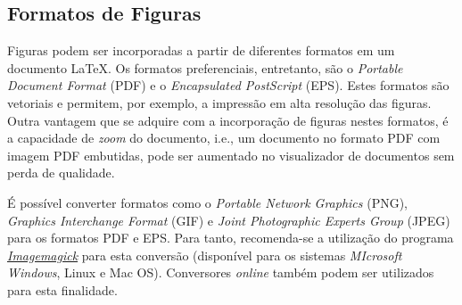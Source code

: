 %
%
%


\subsection*{Formatos de Figuras}
\label{sec:form_docs/figs}

Figuras podem ser incorporadas a partir de diferentes formatos em um documento \LaTeX{}. Os formatos preferenciais, entretanto, são o \textit{Portable Document Format} (PDF) e o \textit{Encapsulated PostScript} (EPS). Estes formatos são vetoriais e permitem, por exemplo, a impressão em alta resolução das figuras. Outra vantagem que se adquire com a incorporação de figuras nestes formatos, é a capacidade de \textit{zoom} do documento, i.e., um documento no formato PDF com imagem PDF embutidas, pode ser aumentado no visualizador de documentos sem perda de qualidade.

É possível converter formatos como o \textit{Portable Network Graphics} (PNG), \textit{Graphics Interchange Format} (GIF) e \textit{Joint Photographic Experts Group} (JPEG) para os formatos PDF e EPS. Para tanto, recomenda-se a utilização do programa \href{https://imagemagick.org/index.php}{\textit{Imagemagick}} para esta conversão (disponível para os sistemas \textit{MIcrosoft Windows}, Linux e Mac OS). Conversores \textit{online} também podem ser utilizados para esta finalidade.

